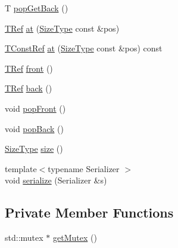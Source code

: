 \begin{DoxyCompactItemize}
\item 
T \hyperlink{structvt_1_1util_1_1container_1_1_concurrent_deque_locked_ad1905f8a1dc68a73ecda8bd2c332440e}{pop\+Get\+Back} ()
\item 
\hyperlink{structvt_1_1util_1_1container_1_1_concurrent_deque_locked_a4451b0e7f6c8aa741f98a77a9fed353e}{T\+Ref} \hyperlink{structvt_1_1util_1_1container_1_1_concurrent_deque_locked_a0999ea4ff06ed38095d31ed9710e7525}{at} (\hyperlink{structvt_1_1util_1_1container_1_1_concurrent_deque_locked_a6f35f4923f1329d25378656b0582e916}{Size\+Type} const \&pos)
\item 
\hyperlink{structvt_1_1util_1_1container_1_1_concurrent_deque_locked_a9da9776dff836c013a95431f3ab15e35}{T\+Const\+Ref} \hyperlink{structvt_1_1util_1_1container_1_1_concurrent_deque_locked_a5c5a48c3f01f61faa7329c2cbfd92103}{at} (\hyperlink{structvt_1_1util_1_1container_1_1_concurrent_deque_locked_a6f35f4923f1329d25378656b0582e916}{Size\+Type} const \&pos) const
\item 
\hyperlink{structvt_1_1util_1_1container_1_1_concurrent_deque_locked_a4451b0e7f6c8aa741f98a77a9fed353e}{T\+Ref} \hyperlink{structvt_1_1util_1_1container_1_1_concurrent_deque_locked_a036bb79b4122e2d79f62c61a7715f374}{front} ()
\item 
\hyperlink{structvt_1_1util_1_1container_1_1_concurrent_deque_locked_a4451b0e7f6c8aa741f98a77a9fed353e}{T\+Ref} \hyperlink{structvt_1_1util_1_1container_1_1_concurrent_deque_locked_ad38ab2b6cb582a65107ef74bcf678f09}{back} ()
\item 
void \hyperlink{structvt_1_1util_1_1container_1_1_concurrent_deque_locked_a24d80e8f7e30a18175f390e79f061a99}{pop\+Front} ()
\item 
void \hyperlink{structvt_1_1util_1_1container_1_1_concurrent_deque_locked_af5c7291d01a60ba4ea5e773de4c2b8e3}{pop\+Back} ()
\item 
\hyperlink{structvt_1_1util_1_1container_1_1_concurrent_deque_locked_a6f35f4923f1329d25378656b0582e916}{Size\+Type} \hyperlink{structvt_1_1util_1_1container_1_1_concurrent_deque_locked_abf19557ef8b6483fd821f7c7fd184153}{size} ()
\item 
{\footnotesize template$<$typename Serializer $>$ }\\void \hyperlink{structvt_1_1util_1_1container_1_1_concurrent_deque_locked_ae3ae8e15fea25fab5f96d3e388aa46d5}{serialize} (Serializer \&s)
\end{DoxyCompactItemize}
\subsection*{Private Member Functions}
\begin{DoxyCompactItemize}
\item 
std\+::mutex $\ast$ \hyperlink{structvt_1_1util_1_1container_1_1_concurrent_deque_locked_af96c5a72abb212cb881833d2c761f2c4}{get\+Mutex} ()
\end{DoxyCompactItemize}
